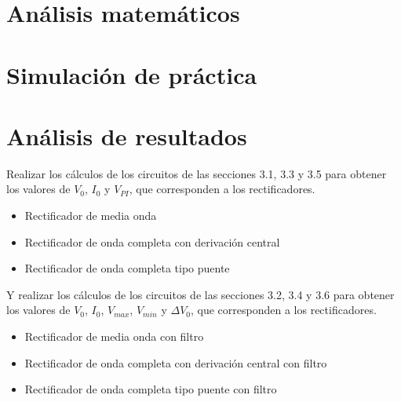 \documentclass[12pt]{article}
\begin{document}
        \section*{Análisis matemáticos}
        \label{sec:calculos}

        \section*{Simulación de práctica}
        \label{sec:simulador}

        \section*{Análisis de resultados}
        \label{sec:resultados}
        Realizar los cálculos de los circuitos de las secciones 3.1, 3.3 y 3.5 para obtener los valores de $V_0$,
        $I_0$ y $V_{PI}$, que corresponden a los rectificadores.\par
        \begin{itemize}
            \item Rectificador de media onda
            \item Rectificador de onda completa con derivación central
            \item Rectificador de onda completa tipo puente
        \end{itemize}


        Y realizar los cálculos de los circuitos de las secciones 3.2, 3.4 y 3.6 para obtener los valores de $V_0$,
        $I_0$, $V_{max}$, $V_{min}$ y $\Delta V_0$, que corresponden a los rectificadores.
        \begin{itemize}
            \item Rectificador de media onda con filtro
            \item Rectificador de onda completa con derivación central con filtro
            \item Rectificador de onda completa tipo puente con filtro
        \end{itemize}
\end{document}
